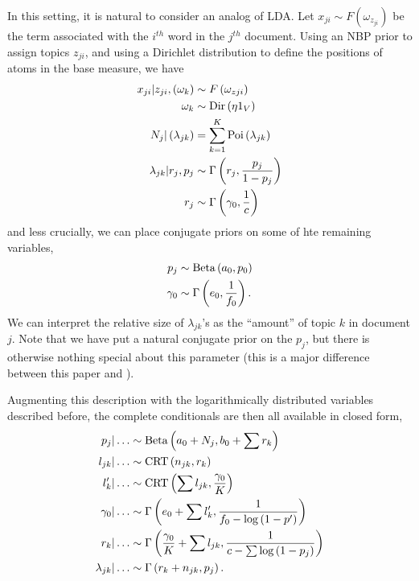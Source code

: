\documentclass{article}
\begin{document}
In this setting, it is natural to consider an analog of LDA. Let $x_{ji} \sim
F\left(\omega_{z_{ji}}\right)$ be the term associated with the $i^{th}$ word in
the $j^{th}$ document. Using an NBP prior to assign topics $z_{ji}$, and using a
Dirichlet distribution to define the positions of atoms in the base measure, we
have
\begin{align}
  x_{ji} \vert z_{ji}, \left(\omega_{k}\right) &\sim F\left(\omega_{z{ji}}\right) \\
  \omega_{k} &\sim \textnormal{Dir}\left(\eta 1_{V}\right) \\
  N_{j} \vert \left(\lambda_{jk}\right)&= \sum_{k = 1}^{K} \textnormal{Poi}\left(\lambda_{jk}\right) \\
  \lambda_{jk} \vert r_{j}, p_{j} &\sim \Gamma\left(r_{j}, \frac{p_{j}}{1 - p_{j}}\right) \\
  r_{j} &\sim \Gamma\left(\gamma_{0}, \frac{1}{c}\right)
\end{align}
and less crucially, we can place conjugate priors on some of hte remaining
variables,
\begin{align}
  p_{j} &\sim \textnormal{Beta}\left(a_{0}, p_{0}\right) \\
  \gamma_{0} &\sim \Gamma\left(e_{0}, \frac{1}{f_{0}}\right).
\end{align}
We can interpret the relative size of $\lambda_{jk}$'s as the ``amount'' of
topic $k$ in document $j$. Note that we have put a natural conjugate prior on
the $p_{j}$, but there is otherwise nothing special about this parameter (this
is a major difference between this paper and \cite{broderick2015combinatorial}).

Augmenting this description with the logarithmically distributed variables
described before, the complete conditionals are then all available in closed
form,
\begin{align}
  p_{j} \vert \dots &\sim \textnormal{Beta}\left(a_{0} + N_{j}, b_{0} + \sum r_{k}\right) \\
  l_{jk} \vert \dots &\sim \textnormal{CRT}\left(n_{jk}, r_{k}\right) \\
  l^{\prime}_{k} \vert \dots &\sim \textnormal{CRT}\left(\sum l_{jk}, \frac{\gamma_{0}}{K}\right) \\
  \gamma_{0} \vert \dots &\sim \Gamma\left(e_{0} + \sum l^{\prime}_{k}, \frac{1}{f_{0} - \log\left(1 - p^{\prime}\right)}\right) \\
  r_{k} \vert \dots &\sim \Gamma\left(\frac{\gamma_{0}}{K} + \sum l_{jk}, \frac{1}{c - \sum \log\left(1 - p_{j}\right)}\right) \\
  \lambda_{jk} \vert \dots &\sim \Gamma\left(r_{k} + n_{jk}, p_{j}\right).
\end{align}
\end{document}
